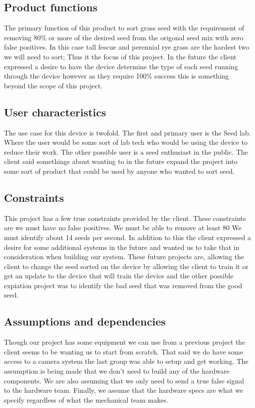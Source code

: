 \documentclass[onecolumn, draftclsnofoot,10pt, compsoc]{IEEEtran}
\begin{document}
\subsection{Product functions}
The primary function of this product to sort grass seed with the requirement of removing 80\% or more of the desired seed from the origonal seed mix with zero false positives.
In this case tall fescue and perennial rye grass are the hardest two we will need to sort; Thus it the focus of this project.
In the future the client expressed a desire to have the device determine the type of each seed running through the device however as they require 100\% success this is something beyond the scope of this project.

\subsection{User characteristics}
The use case for this device is twofold.
The first and primary user is the Seed lab.
Where the user would be some sort of lab tech who would be using the device to reduce their work.
The other possible user is a seed enthusiast in the public.
The client said somethings about wanting to in the future expand the project into some sort of product that could be used by anyone who wanted to sort seed.

\subsection{Constraints}
This project has a few true constraints provided by the client.
These constraints are we must have no false positives. We must be able to remove at least 80%
We must identify about 14 seeds per second.
In addition to this the client expressed a desire for some additional systems in the future and wanted us to take that in consideration when building our system.
These future projects are, allowing the client to change the seed sorted on the device by allowing the client to train it or get an update to the device that will train the device and the other possible expiation project was to identify the bad seed that was removed from the good seed.

\subsection{Assumptions and dependencies}
Though our project has some equipment we can use from a previous project the client seems to be wanting us to start from scratch.
That said we do have some access to a camera system the last group was able to setup and get working.
The assumption is being made that we don’t need to build any of the hardware components.
We are also assuming that we only need to send a true false signal to the hardware team.
Finally, we assume that the hardware specs are what we specify regardless of what the mechanical team makes.
\end{document}
